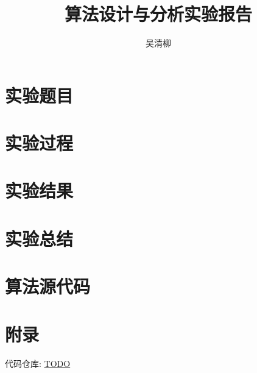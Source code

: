 \documentclass[12pt, twoside]{article}
\title{算法设计与分析实验报告}
\author{\textup{吴清柳}}
\begin{document}

\tableofcontents
\newpage

\pagestyle{fancy}
\fancyhead{} %
\fancyfoot{} %
\fancyfoot[CE, CO]{\thepage}

\section{实验题目}

\section{实验过程}

\section{实验结果}

\section{实验总结}

\section{算法源代码}

\section{附录}
代码仓库: \href{TODO}{TODO}

% 
% 
\end{document}
